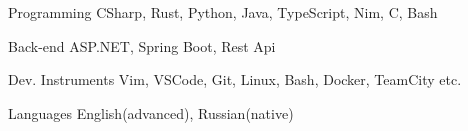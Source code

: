 

\begin{cvskills}

  \cvskill
    {Programming} %
    {CSharp, Rust, Python, Java, TypeScript, Nim, C, Bash} %

  \cvskill
  {Back-end} %
  {ASP.NET, Spring Boot, Rest Api} %

  \cvskill
    {Dev. Instruments} %
    {Vim, VSCode, Git, Linux, Bash, Docker, TeamCity etc.} %

  \cvskill
  {Languages} %
  {English(advanced), Russian(native)} %

\end{cvskills}
